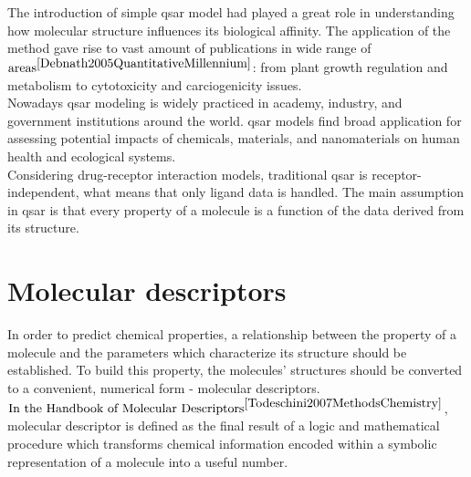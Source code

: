 The introduction of simple \acrshort{qsar} model had played a great role in understanding 
how molecular structure influences its biological affinity.
The application of the method gave rise to vast amount of publications in wide range 
of $\text{areas}^{\cite{Debnath2005QuantitativeMillennium}}$: from plant growth 
regulation and metabolism to cytotoxicity and carciogenicity issues.
\hfill\break\\

Nowadays \acrshort{qsar} modeling is widely practiced in academy, industry, and 
government institutions around the world.
\acrshort{qsar} models find broad application for assessing potential impacts of chemicals, materials, and nanomaterials on human health and ecological systems.
\hfill\break\\
Considering drug-receptor interaction models, traditional \acrshort{qsar} is receptor-independent, 
what means that only ligand data is handled.
The main assumption in \acrshort{qsar} is that every property of a molecule is a 
function of the data derived from its structure.
\hfill\break\\
\section{Molecular descriptors}
  In order to predict chemical properties, a relationship between the property of 
a molecule and the parameters which characterize its structure should be established.
  To build this property, the molecules' structures should be converted to a convenient, 
numerical form - molecular descriptors.
  $\text{In the Handbook of Molecular Descriptors}^{\cite{Todeschini2007MethodsChemistry}}$,
  molecular descriptor is defined as the final result of a logic and mathematical 
procedure which transforms chemical information encoded within a symbolic representation 
of a molecule into a useful number. \\

